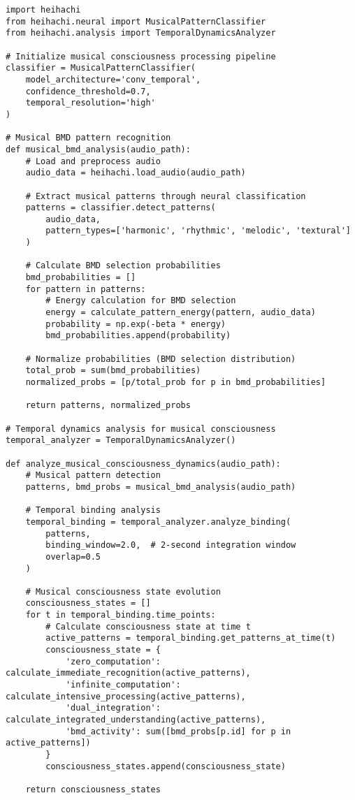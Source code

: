 \documentclass[12pt,a4paper]{article}
\begin{document}
\begin{lstlisting}[style=pythonstyle, caption=Neural Musical Pattern Classification]
import heihachi
from heihachi.neural import MusicalPatternClassifier
from heihachi.analysis import TemporalDynamicsAnalyzer

# Initialize musical consciousness processing pipeline
classifier = MusicalPatternClassifier(
    model_architecture='conv_temporal',
    confidence_threshold=0.7,
    temporal_resolution='high'
)

# Musical BMD pattern recognition
def musical_bmd_analysis(audio_path):
    # Load and preprocess audio
    audio_data = heihachi.load_audio(audio_path)
    
    # Extract musical patterns through neural classification
    patterns = classifier.detect_patterns(
        audio_data,
        pattern_types=['harmonic', 'rhythmic', 'melodic', 'textural']
    )
    
    # Calculate BMD selection probabilities
    bmd_probabilities = []
    for pattern in patterns:
        # Energy calculation for BMD selection
        energy = calculate_pattern_energy(pattern, audio_data)
        probability = np.exp(-beta * energy)
        bmd_probabilities.append(probability)
    
    # Normalize probabilities (BMD selection distribution)
    total_prob = sum(bmd_probabilities)
    normalized_probs = [p/total_prob for p in bmd_probabilities]
    
    return patterns, normalized_probs

# Temporal dynamics analysis for musical consciousness
temporal_analyzer = TemporalDynamicsAnalyzer()

def analyze_musical_consciousness_dynamics(audio_path):
    # Musical pattern detection
    patterns, bmd_probs = musical_bmd_analysis(audio_path)
    
    # Temporal binding analysis
    temporal_binding = temporal_analyzer.analyze_binding(
        patterns,
        binding_window=2.0,  # 2-second integration window
        overlap=0.5
    )
    
    # Musical consciousness state evolution
    consciousness_states = []
    for t in temporal_binding.time_points:
        # Calculate consciousness state at time t
        active_patterns = temporal_binding.get_patterns_at_time(t)
        consciousness_state = {
            'zero_computation': calculate_immediate_recognition(active_patterns),
            'infinite_computation': calculate_intensive_processing(active_patterns),
            'dual_integration': calculate_integrated_understanding(active_patterns),
            'bmd_activity': sum([bmd_probs[p.id] for p in active_patterns])
        }
        consciousness_states.append(consciousness_state)
    
    return consciousness_states
\end{lstlisting}
\end{document}

